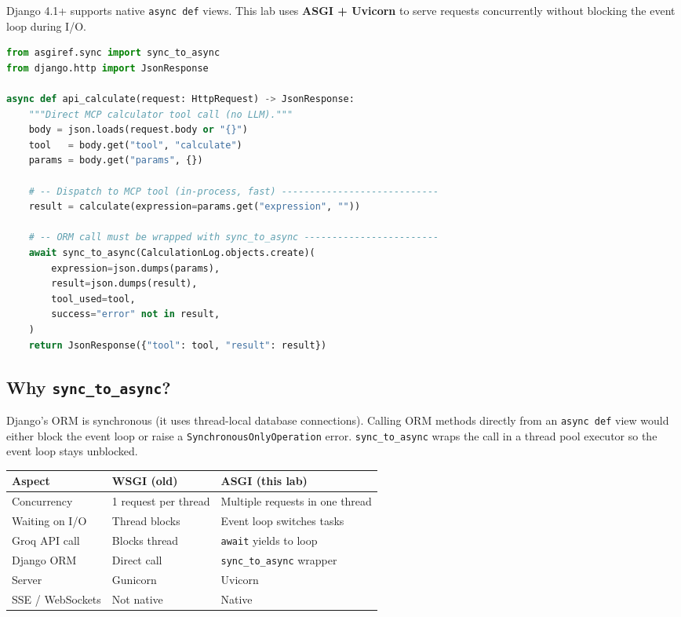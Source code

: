 \documentclass[11pt,a4paper]{article}
\begin{document}
Django 4.1+ supports native \texttt{async def} views. This lab uses
\textbf{ASGI + Uvicorn} to serve requests concurrently without blocking
the event loop during I/O.

\begin{lstlisting}[language=Python, caption={Async view with sync ORM wrapper}]
from asgiref.sync import sync_to_async
from django.http import JsonResponse

async def api_calculate(request: HttpRequest) -> JsonResponse:
    """Direct MCP calculator tool call (no LLM)."""
    body = json.loads(request.body or "{}")
    tool   = body.get("tool", "calculate")
    params = body.get("params", {})

    # -- Dispatch to MCP tool (in-process, fast) ----------------------------
    result = calculate(expression=params.get("expression", ""))

    # -- ORM call must be wrapped with sync_to_async ------------------------
    await sync_to_async(CalculationLog.objects.create)(
        expression=json.dumps(params),
        result=json.dumps(result),
        tool_used=tool,
        success="error" not in result,
    )
    return JsonResponse({"tool": tool, "result": result})
\end{lstlisting}

\subsection{Why \texttt{sync\_to\_async}?}

Django's ORM is synchronous (it uses thread-local database connections).
Calling ORM methods directly from an \texttt{async def} view would either
block the event loop or raise a \texttt{SynchronousOnlyOperation} error.
\texttt{sync\_to\_async} wraps the call in a thread pool executor so the
event loop stays unblocked.

\begin{center}
\begin{tabularx}{\linewidth}{lXX}
\toprule
\textbf{Aspect}        & \textbf{WSGI (old)}       & \textbf{ASGI (this lab)} \\
\midrule
Concurrency            & 1 request per thread      & Multiple requests in one thread \\
Waiting on I/O         & Thread blocks             & Event loop switches tasks \\
Groq API call          & Blocks thread             & \texttt{await} yields to loop \\
Django ORM             & Direct call               & \texttt{sync\_to\_async} wrapper \\
Server                 & Gunicorn                  & Uvicorn \\
SSE / WebSockets       & Not native                & Native \\
\bottomrule
\end{tabularx}
\end{center}
\end{document}

